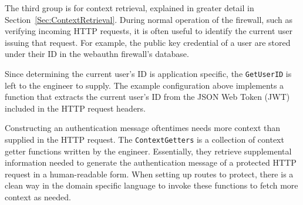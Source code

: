 The third group is for context retrieval, explained in greater detail in Section~\ref{Sec:ContextRetrieval}. During normal operation of the firewall, such as verifying incoming HTTP requests, it is often useful to identify the current user issuing that request. For example, the public key credential of a user are stored under their ID in the webauthn firewall's database. 

Since determining the current user's ID is application specific, the \lstinline{GetUserID} is left to the engineer to supply. The example configuration above implements a function that extracts the current user's ID from the JSON Web Token (JWT) included in the HTTP request headers.

Constructing an authentication message oftentimes needs more context than supplied in the HTTP request. The \lstinline{ContextGetters} is a collection of context getter functions written by the engineer. Essentially, they retrieve supplemental information needed to generate the authentication message of a protected HTTP request in a human-readable form. When setting up routes to protect, there is a clean way in the domain specific language to invoke these functions to fetch more context as needed.







